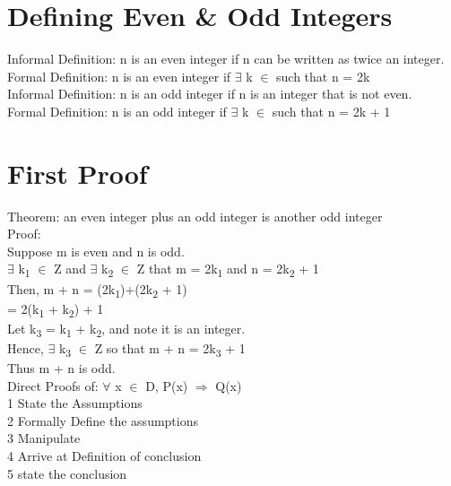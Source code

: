 \documentclass[11pt]{article}
\begin{document}
\section{Defining Even \& Odd Integers}
\label{sec:orgc8c7bbb}
Informal Definition: n is an even integer if n can be written as twice an integer.\\
Formal Definition: n is an even integer if \(\exists\) k \(\in\)  such that n = 2k\\

Informal Definition: n is an odd integer if n is an integer that is not even.\\
Formal Definition: n is an odd integer if \(\exists\) k \(\in\)  such that n = 2k + 1\\

\section{First Proof}
\label{sec:orgd6360c1}
Theorem: an even integer plus an odd integer is another odd integer\\
Proof:\\
Suppose m is even and n is odd.\\
\(\exists\) k\textsubscript{1} \(\in\) Z and \(\exists\) k\textsubscript{2} \(\in\) Z that m = 2k\textsubscript{1} and n = 2k\textsubscript{2} + 1\\

Then, m + n = (2k\textsubscript{1})+(2k\textsubscript{2} + 1)\\
= 2(k\textsubscript{1} + k\textsubscript{2}) + 1\\
Let k\textsubscript{3} = k\textsubscript{1} + k\textsubscript{2}, and note it is an integer.\\

Hence, \(\exists\) k\textsubscript{3} \(\in\) Z so that m + n = 2k\textsubscript{3} + 1\\
Thus m + n is odd.\\

Direct Proofs of: \(\forall\) x \(\in\) D, P(x) \(\Rightarrow\) Q(x)\\
1 State the Assumptions\\
2 Formally Define the assumptions\\
3 Manipulate\\
4 Arrive at Definition of conclusion\\
5 state the conclusion\\
\end{document}
